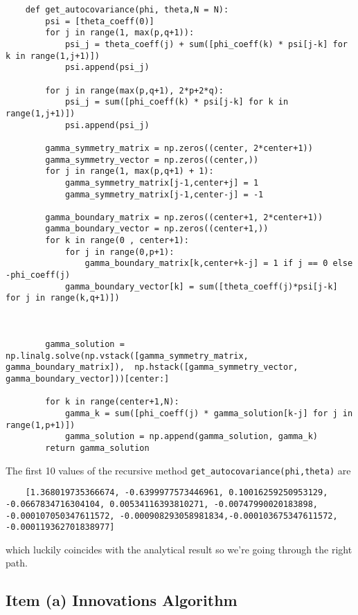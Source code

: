 \begin{verbatim}
    def get_autocovariance(phi, theta,N = N): 
        psi = [theta_coeff(0)]
        for j in range(1, max(p,q+1)):
            psi_j = theta_coeff(j) + sum([phi_coeff(k) * psi[j-k] for k in range(1,j+1)])
            psi.append(psi_j)

        for j in range(max(p,q+1), 2*p+2*q):
            psi_j = sum([phi_coeff(k) * psi[j-k] for k in range(1,j+1)])
            psi.append(psi_j)

        gamma_symmetry_matrix = np.zeros((center, 2*center+1))
        gamma_symmetry_vector = np.zeros((center,))
        for j in range(1, max(p,q+1) + 1):
            gamma_symmetry_matrix[j-1,center+j] = 1
            gamma_symmetry_matrix[j-1,center-j] = -1
        
        gamma_boundary_matrix = np.zeros((center+1, 2*center+1))
        gamma_boundary_vector = np.zeros((center+1,))
        for k in range(0 , center+1):
            for j in range(0,p+1):
                gamma_boundary_matrix[k,center+k-j] = 1 if j == 0 else -phi_coeff(j)
            gamma_boundary_vector[k] = sum([theta_coeff(j)*psi[j-k] for j in range(k,q+1)])



        gamma_solution = np.linalg.solve(np.vstack([gamma_symmetry_matrix, gamma_boundary_matrix]),  np.hstack([gamma_symmetry_vector, gamma_boundary_vector]))[center:]

        for k in range(center+1,N):
            gamma_k = sum([phi_coeff(j) * gamma_solution[k-j] for j in range(1,p+1)])
            gamma_solution = np.append(gamma_solution, gamma_k)
        return gamma_solution
\end{verbatim}

The first 10 values of the recursive method \texttt{get_autocovariance(phi,theta)}  are
\begin{verbatim}
    [1.368019735366674, -0.6399977573446961, 0.10016259250953129, -0.0667834716304104, 0.00534116393810271, -0.00747990020183898, -0.000107050347611572, -0.000908293058981834,-0.000103675347611572, -0.000119362701838977]
\end{verbatim}
which luckily coincides with the analytical result so we're going through the right path.

\subsection*{Item (a) Innovations Algorithm}

